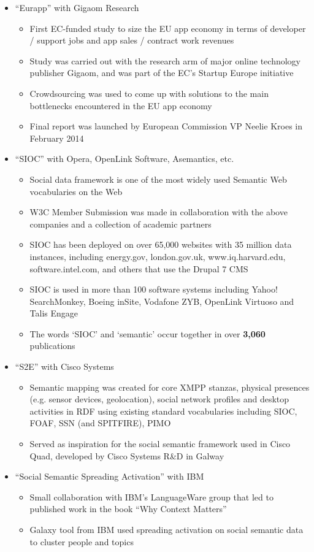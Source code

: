 \documentclass[10pt,a4paper]{res} %
\begin{document}
\begin{resume}
\begin{itemize} \itemsep -2pt
\item ``Eurapp'' with Gigaom Research
\begin{itemize} \itemsep -2pt
\item First EC-funded study to size the EU app economy in terms of developer / support jobs and app sales / contract work revenues
\item Study was carried out with the research arm of major online technology publisher Gigaom, and was part of the EC's Startup Europe initiative
\item Crowdsourcing was used to come up with solutions to the main bottlenecks encountered in the EU app economy
\item Final report was launched by European Commission VP Neelie Kroes in February 2014
\end{itemize}
\item ``SIOC'' with Opera, OpenLink Software, Asemantics, etc.
\begin{itemize} \itemsep -2pt
\item Social data framework is one of the most widely used Semantic Web vocabularies on the Web
\item W3C Member Submission was made in collaboration with the above companies and a collection of academic partners
\item SIOC has been deployed on over 65,000 websites with 35 million data instances, including energy.gov, london.gov.uk, www.iq.harvard.edu, software.intel.com, and others that use the Drupal 7 CMS
\item SIOC is used in more than 100 software systems including Yahoo! SearchMonkey, Boeing inSite, Vodafone ZYB, OpenLink Virtuoso and Talis Engage
\item The words `SIOC' and `semantic' occur together in over \textbf{3,060} publications
\end{itemize}
\item ``S2E'' with Cisco Systems
\begin{itemize} \itemsep -2pt
\item Semantic mapping was created for core XMPP stanzas, physical presences (e.g. sensor devices, geolocation), social network profiles and desktop activities in RDF using existing standard vocabularies including SIOC, FOAF, SSN (and SPITFIRE), PIMO
\item Served as inspiration for the social semantic framework used in Cisco Quad, developed by Cisco Systems R\&D in Galway
\end{itemize}
\item ``Social Semantic Spreading Activation'' with IBM
\begin{itemize} \itemsep -2pt
\item Small collaboration with IBM's LanguageWare group that led to published work in the book ``Why Context Matters''
\item Galaxy tool from IBM used spreading activation on social semantic data to cluster people and topics
\end{itemize}
\end{itemize}


\end{resume}
\end{document}

